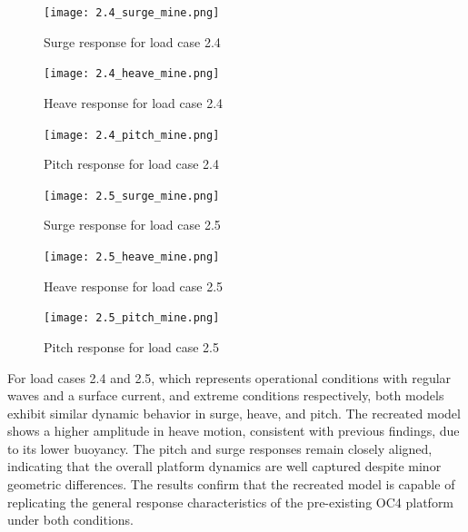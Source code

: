 \documentclass[a4paper, 11pt]{article}
\begin{document}
\begin{figure}[H]
    \begin{minipage}{0.48\textwidth}
        \centering
        \texttt{[image: 2.4\_surge\_mine.png]}
        \caption{\small Surge response for load case 2.4}
        \label{fig:2.4_surge_mine_recreated}
    \end{minipage}
    \hfill
    \begin{minipage}{0.5\textwidth}
        \centering
        \texttt{[image: 2.4\_heave\_mine.png]}
        \caption{\small Heave response for load case 2.4}
        \label{fig:2.4_heave_mine_recreated}
    \end{minipage}
\end{figure}

\begin{figure}[H]
    \begin{minipage}{0.48\textwidth}
        \centering
        \texttt{[image: 2.4\_pitch\_mine.png]}
        \caption{\small Pitch response for load case 2.4}
        \label{fig:2.4_pitch_mine_recreated}
    \end{minipage}
    \hfill
    \begin{minipage}{0.5\textwidth}
        \centering
        \texttt{[image: 2.5\_surge\_mine.png]}
        \caption{\small Surge response for load case 2.5}
        \label{fig:2.5_surge_mine_recreated}
    \end{minipage}
\end{figure}

\begin{figure}[H]
    \begin{minipage}{0.48\textwidth}
        \centering
        \texttt{[image: 2.5\_heave\_mine.png]}
        \caption{\small Heave response for load case 2.5}
        \label{fig:2.5_heave_mine_recreated}
    \end{minipage}
    \hfill
    \begin{minipage}{0.5\textwidth}
        \centering
        \texttt{[image: 2.5\_pitch\_mine.png]}
        \caption{\small Pitch response for load case 2.5}
        \label{fig:2.5_pitch_mine_recreated}
    \end{minipage}
\end{figure}

For load cases 2.4 and 2.5, which represents operational conditions with regular waves and a surface current, and extreme conditions respectively, both models exhibit similar dynamic behavior in surge, heave, and pitch. The recreated model shows a higher amplitude in heave motion, consistent with previous findings, due to its lower buoyancy. The pitch and surge responses remain closely aligned, indicating that the overall platform dynamics are well captured despite minor geometric differences. The results confirm that the recreated model is capable of replicating the general response characteristics of the pre-existing OC4 platform under both conditions.
\end{document}
